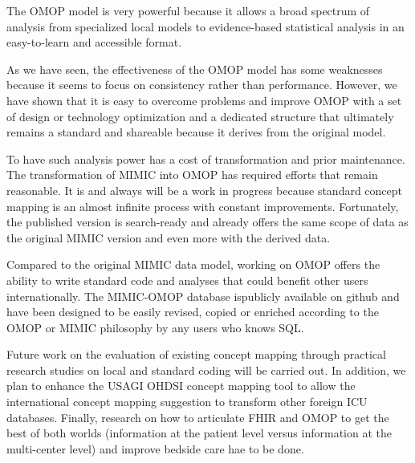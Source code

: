 The OMOP model is very powerful because it allows a broad spectrum of analysis 
from specialized local models to evidence-based statistical analysis in an 
easy-to-learn and accessible format.

As we have seen, the effectiveness of the OMOP model has some weaknesses because 
it seems to focus on consistency rather than performance. However, we have shown 
that it is easy to overcome problems and improve OMOP with a set of design or 
technology optimization and a dedicated structure that ultimately remains a 
standard and shareable because it derives from the original model.

To have such analysis power has a cost of transformation and prior maintenance. 
The transformation of MIMIC into OMOP has required efforts that remain reasonable. 
It is and always will be a work in progress because standard concept mapping is 
an almost infinite process with constant improvements. Fortunately, the published 
version is search-ready and already offers the same scope of data as the original 
MIMIC version and even more with the derived data.


Compared to the original MIMIC data model, working on OMOP offers the ability to 
write standard code and analyses that could benefit other users internationally. 
The MIMIC-OMOP database ispublicly available on github \cite{mimic-omop-github} 
and have been designed to be easily revised, copied or enriched according to 
the OMOP or MIMIC philosophy by any users who knows SQL.



Future work on the evaluation of existing concept mapping through practical 
research studies on local and standard coding will be carried out. In addition, 
we plan to enhance the USAGI OHDSI concept mapping tool to allow the international 
concept mapping suggestion to transform other foreign ICU databases. Finally, 
research on how to articulate FHIR and OMOP to get the best of both worlds 
(information at the patient level versus information at the multi-center level) 
and improve bedside care hae to be done.
